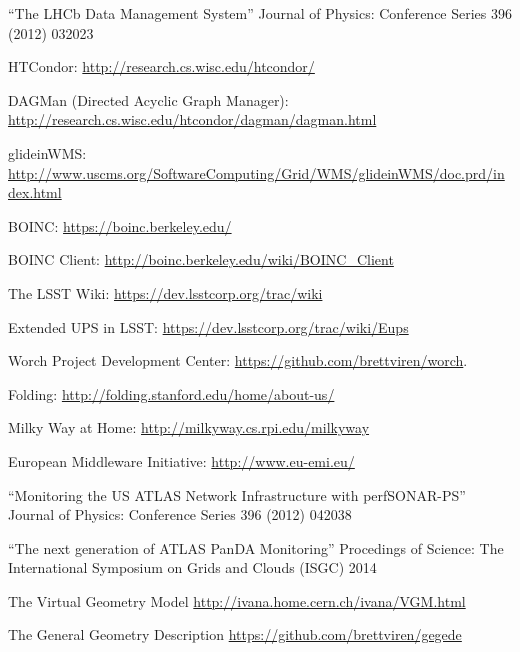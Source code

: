 \begin{thebibliography}{99}
 ``The LHCb Data Management System'' Journal of Physics: Conference Series 396 (2012) 032023

 HTCondor: \url{http://research.cs.wisc.edu/htcondor/}

 DAGMan (Directed Acyclic Graph Manager): \url{http://research.cs.wisc.edu/htcondor/dagman/dagman.html}

 glideinWMS: \url{http://www.uscms.org/SoftwareComputing/Grid/WMS/glideinWMS/doc.prd/index.html}

 BOINC: \url{https://boinc.berkeley.edu/}

 BOINC Client: \url{http://boinc.berkeley.edu/wiki/BOINC_Client}

 The LSST Wiki: \url{https://dev.lsstcorp.org/trac/wiki}

 Extended UPS in LSST: \url{https://dev.lsstcorp.org/trac/wiki/Eups}

 Worch Project Development Center: \url{https://github.com/brettviren/worch}.

 Folding: \url{http://folding.stanford.edu/home/about-us/}

 Milky Way at Home: \url{http://milkyway.cs.rpi.edu/milkyway}

 European Middleware Initiative: \url{http://www.eu-emi.eu/}

 ``Monitoring the US ATLAS Network Infrastructure with perfSONAR-PS'' Journal of Physics: Conference Series 396 (2012) 042038

 ``The next generation of ATLAS PanDA Monitoring'' Procedings of Science: The International Symposium on Grids and Clouds (ISGC) 2014

 The Virtual Geometry Model \url{http://ivana.home.cern.ch/ivana/VGM.html}

 The General Geometry Description \url{https://github.com/brettviren/gegede}

\end{thebibliography}
